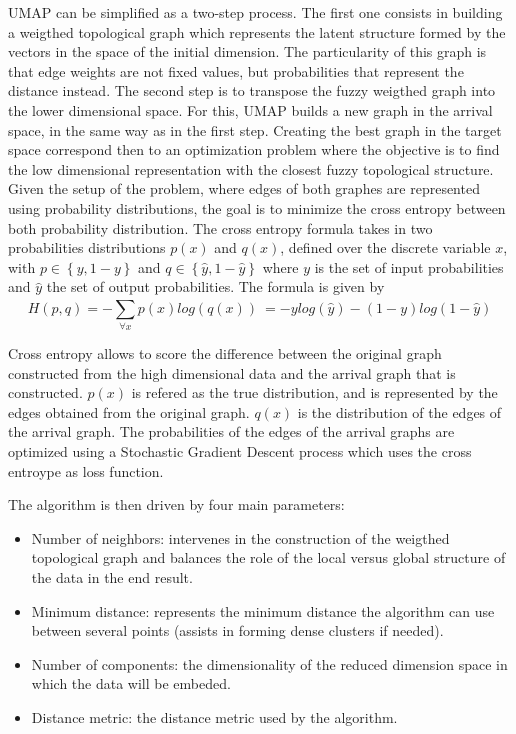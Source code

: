 UMAP can be simplified as a two-step process.
The first one consists in building a weigthed topological graph which represents the latent
structure formed by the vectors in the space of the initial dimension.
The particularity of this graph is that edge weights are not fixed values, but probabilities
that represent the distance instead.
The second step is to transpose the fuzzy weigthed graph into the lower dimensional space.
For this, UMAP builds a new graph in the arrival space, in the same way as in the first step.
Creating the best graph in the target space correspond then to an optimization problem where
the objective is to find the low dimensional representation with the closest fuzzy topological structure.
Given the setup of the problem, where edges of both graphes are represented using probability
distributions, the goal is to minimize the cross entropy between both probability distribution.
The cross entropy formula takes in two probabilities distributions \(p(x)\) and \(q(x)\),
defined over the discrete variable \(x\), with \( p \in \left\{y,1-y\right\}\) and \( q \in \left\{\hat{y},1-\hat{y}\right\}\)
where \(y\) is the set of input probabilities and \(\hat{y}\) the set of output probabilities.
The formula is given by
\[H(p,q)=-\sum_{\forall x}^{} p\left(x\right) log\left(q\left(x\right) \right)\ = -y log\left(\hat{y}\right) - \left(1-y\right) log\left(1 - \hat{y}\right)\]

Cross entropy allows to score the difference between the original graph
constructed from the high dimensional data and the arrival graph that is constructed.
\(p(x)\) is refered as the true distribution, and is represented by the edges obtained from
the original graph.
\(q(x)\) is the distribution of the edges of the arrival graph.
The probabilities of the edges of the arrival graphs are optimized using a Stochastic
Gradient Descent process which uses the cross entroype as loss function.

The algorithm is then driven by four main parameters:

\begin{itemize}
    \item Number of neighbors: intervenes in the construction of the weigthed topological graph
          and balances the role of the local versus global structure of the data in the end result.
    \item Minimum distance: represents the minimum distance the algorithm can use between several points (assists in forming dense clusters if needed).
    \item Number of components: the dimensionality of the reduced dimension space in which the data will be embeded.
    \item Distance metric: the distance metric used by the algorithm.
\end{itemize}

